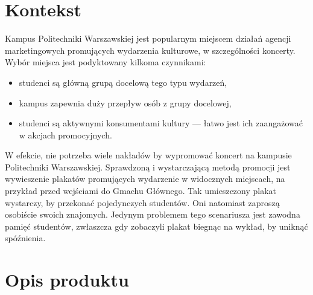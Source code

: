 \documentclass[10pt]{dokument-ppi}
\begin{document}
\MakeDokumentMeta


\section{Kontekst}

Kampus Politechniki Warszawskiej jest popularnym miejscem działań agencji
marketingowych promujących wydarzenia kulturowe, w szczególności koncerty. Wybór
miejsca jest podyktowany kilkoma czynnikami:
\begin{itemize}
    \item studenci są główną grupą docelową tego typu wydarzeń,
    \item kampus zapewnia duży przepływ osób z grupy docelowej,
    \item studenci są aktywnymi konsumentami kultury --- łatwo jest ich
        zaangażować w akcjach promocyjnych.
\end{itemize}
W efekcie, nie potrzeba wiele nakładów by wypromować koncert na kampusie
Politechniki Warszawskiej. Sprawdzoną i wystarczającą metodą promocji jest
wywieszenie plakatów promujących wydarzenie w widocznych miejscach, na przykład
przed wejściami do Gmachu Głównego. Tak umieszczony plakat wystarczy, by
przekonać pojedynczych studentów. Oni natomiast zaproszą osobiście swoich
znajomych. Jedynym problemem tego scenariusza jest zawodna pamięć studentów,
zwłaszcza gdy zobaczyli plakat biegnąc na wykład, by uniknąć spóźnienia.


%


\section{Opis produktu}
\end{document}
